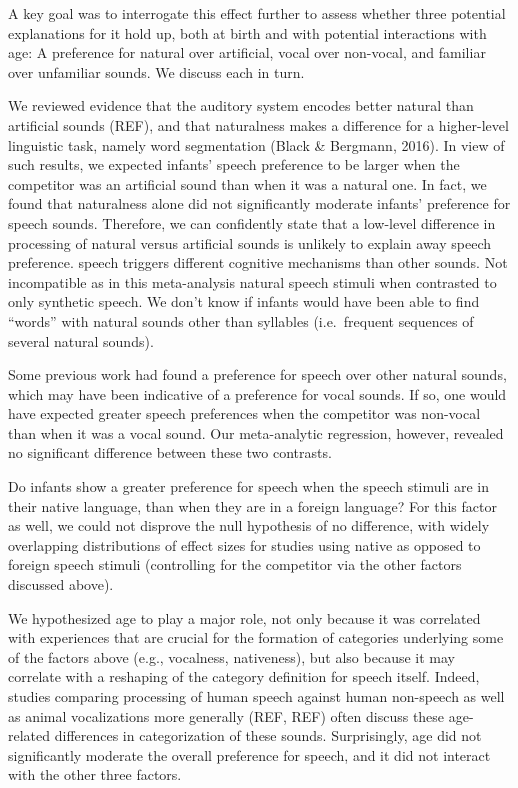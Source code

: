 \documentclass[man]{apa6}
\begin{document}
A key goal was to interrogate this effect further to assess whether
three potential explanations for it hold up, both at birth and with
potential interactions with age: A preference for natural over
artificial, vocal over non-vocal, and familiar over unfamiliar sounds.
We discuss each in turn.

We reviewed evidence that the auditory system encodes better natural
than artificial sounds (REF), and that naturalness makes a difference
for a higher-level linguistic task, namely word segmentation (Black \&
Bergmann, 2016). In view of such results, we expected infants' speech
preference to be larger when the competitor was an artificial sound than
when it was a natural one. In fact, we found that naturalness alone did
not significantly moderate infants' preference for speech sounds.
Therefore, we can confidently state that a low-level difference in
processing of natural versus artificial sounds is unlikely to explain
away speech preference. speech triggers different cognitive mechanisms
than other sounds. Not incompatible as in this meta-analysis natural
speech stimuli when contrasted to only synthetic speech. We don't know
if infants would have been able to find \enquote{words} with natural
sounds other than syllables (i.e.~frequent sequences of several natural
sounds).

Some previous work had found a preference for speech over other natural
sounds, which may have been indicative of a preference for vocal sounds.
If so, one would have expected greater speech preferences when the
competitor was non-vocal than when it was a vocal sound. Our
meta-analytic regression, however, revealed no significant difference
between these two contrasts.

Do infants show a greater preference for speech when the speech stimuli
are in their native language, than when they are in a foreign language?
For this factor as well, we could not disprove the null hypothesis of no
difference, with widely overlapping distributions of effect sizes for
studies using native as opposed to foreign speech stimuli (controlling
for the competitor via the other factors discussed above).

We hypothesized age to play a major role, not only because it was
correlated with experiences that are crucial for the formation of
categories underlying some of the factors above (e.g., vocalness,
nativeness), but also because it may correlate with a reshaping of the
category definition for speech itself. Indeed, studies comparing
processing of human speech against human non-speech as well as animal
vocalizations more generally (REF, REF) often discuss these age-related
differences in categorization of these sounds. Surprisingly, age did not
significantly moderate the overall preference for speech, and it did not
interact with the other three factors.
\end{document}
